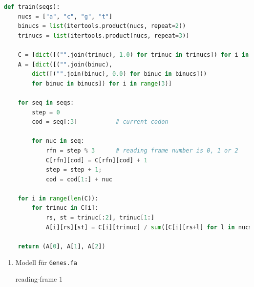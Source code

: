 \documentclass{homework}
\begin{document}
\begin{enumerate}
\begin{lstlisting}[language=python]
def train(seqs):
	nucs = ["a", "c", "g", "t"]
	binucs = list(itertools.product(nucs, repeat=2))
	trinucs = list(itertools.product(nucs, repeat=3))

	C = [dict([("".join(trinuc), 1.0) for trinuc in trinucs]) for i in range(3)]
	A = [dict([("".join(binuc),
		dict([("".join(binuc), 0.0) for binuc in binucs]))
		for binuc in binucs]) for i in range(3)]

	for seq in seqs:
		step = 0
		cod = seq[:3]			# current codon

		for nuc in seq:
			rfn = step % 3		# reading frame number is 0, 1 or 2
			C[rfn][cod] = C[rfn][cod] + 1
			step = step + 1;
			cod = cod[1:] + nuc

	for i in range(len(C)):
		for trinuc in C[i]:
			rs, st = trinuc[:2], trinuc[1:]
			A[i][rs][st] = C[i][trinuc] / sum([C[i][rs+l] for l in nucs])

	return (A[0], A[1], A[2])
\end{lstlisting}

\begin{enumerate}

\item Modell für \texttt{Genes.fa}

\tiny

\normalsize
reading-frame 1
\tiny


\end{enumerate}
\end{enumerate}
\end{document}
